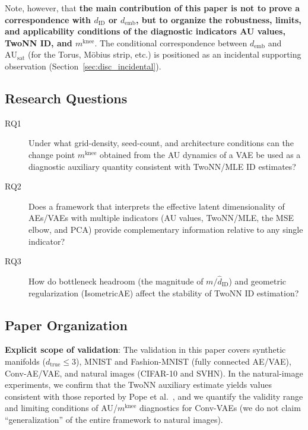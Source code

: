 \documentclass[make,article,submit,pdftex,moreauthors]{Definitions/mdpi}
\newcommand{\dID}{d_{\mathrm{ID}}}
\newcommand{\AUsat}{\mathrm{AU}_{\mathrm{sat}}}
\newcommand{\mknee}{m^{\mathrm{knee}}}
\newcommand{\demb}{d_{\mathrm{emb}}}
\begin{document}
Note, however, that \textbf{the main contribution of this paper is not to prove a
correspondence with $\dID$ or $\demb$, but to organize the robustness, limits,
and applicability conditions of the diagnostic indicators AU values, TwoNN ID,
and $\mknee$}.
The conditional correspondence between $\demb$ and $\AUsat$ (for the Torus,
M\"obius strip, etc.) is positioned as an incidental supporting observation
(Section~\ref{sec:disc_incidental}).

\subsection{Research Questions}\label{sec:intro_rq}

\begin{description}
  \item[RQ1] Under what grid-density, seed-count, and architecture conditions can
             the change point $\mknee$ obtained from the AU dynamics of a VAE be
             used as a diagnostic auxiliary quantity consistent with TwoNN/MLE
             ID estimates?
  \item[RQ2] Does a framework that interprets the effective latent dimensionality
             of AEs/VAEs with multiple indicators (AU values, TwoNN/MLE, the MSE
             elbow, and PCA) provide complementary information relative to any
             single indicator?
  \item[RQ3] How do bottleneck headroom (the magnitude of $m / \hat{d}_\mathrm{ID}$)
             and geometric regularization (IsometricAE) affect the stability of
             TwoNN ID estimation?
\end{description}

\subsection{Paper Organization}\label{sec:intro_structure}

\textbf{Explicit scope of validation}:
The validation in this paper covers synthetic manifolds
($d_{\mathrm{true}} \leq 3$), MNIST and Fashion-MNIST (fully connected AE/VAE),
Conv-AE/VAE, and natural images (CIFAR-10 and SVHN).
In the natural-image experiments, we confirm that the TwoNN auxiliary estimate
yields values consistent with those reported by
Pope et al.~\cite{pope2021intrinsic}, and we quantify the validity range and
limiting conditions of AU/$\mknee$ diagnostics for Conv-VAEs
(we do not claim ``generalization'' of the entire framework to natural images).
\end{document}
